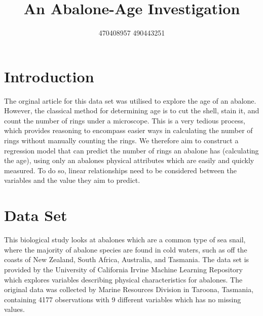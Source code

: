 \documentclass[letterpaper,9pt,twocolumn,twoside,]{pinp}
\title{An Abalone-Age Investigation}
\author[]{470408957 \textbar{} 490443251 \textbar{}}
\begin{document}
\verticaladjustment{-2pt}

\maketitle
\thispagestyle{firststyle}



\hypertarget{introduction}{%
\section{Introduction}\label{introduction}}

The orginal article for this data set was utilised to explore the age of
an abalone. However, the classical method for determining age is to cut
the shell, stain it, and count the number of rings under a microscope.
This is a very tedious process, which provides reasoning to encompass
easier ways in calculating the number of rings without manually counting
the rings. We therefore aim to construct a regression model that can
predict the number of rings an abalone has (calculating the age), using
only an abalones physical attributes which are easily and quickly
measured. To do so, linear relationships need to be considered between
the variables and the value they aim to predict.

\hypertarget{data-set}{%
\section{Data Set}\label{data-set}}

This biological study looks at abalones which are a common type of sea
snail, where the majority of abalone species are found in cold waters,
such as off the coasts of New Zealand, South Africa, Australia, and
Tasmania. The data set is provided by the University of California
Irvine Machine Learning Repository which explores variables describing
physical characteristics for abalones. The original data was collected
by Marine Resources Division in Taroona, Tasmania, containing 4177
observations with 9 different variables which has no missing values.
\end{document}
